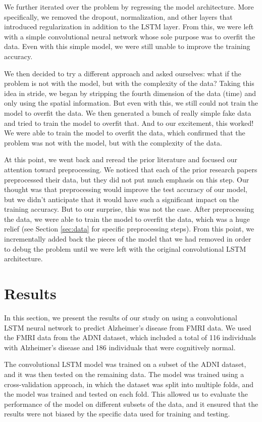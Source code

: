 \documentclass[10pt]{article}
\begin{document}
	We further iterated over the problem by regressing the model architecture. More specifically, we removed the dropout, normalization, and other layers that introduced regularization in addition to the LSTM layer. From this, we 
	were left with a simple convolutional neural network whose sole purpose was to overfit the data. Even with this simple model, we were still unable to improve the training accuracy. 

	We then decided to try a different approach and asked ourselves: what if the problem is not with the model, but with the complexity of the data? Taking this idea in stride, we began by stripping the fourth dimension of the data (time) and only using the spatial information. But even with this, we still could not train the model to overfit the data. We then generated a bunch of really simple fake data and tried to train the model to overfit that. And to our excitement, this worked! We were able to train the model to overfit the data, which confirmed that the problem was not with the model, but with the complexity of the data.

	At this point, we went back and reread the prior literature and focused our attention toward preprocessing. We noticed that each of the prior research papers preprocessed their data, but they did not put much emphasis on this step. Our thought was that preprocessing would improve the test accuracy of our model, but we didn't anticipate that it would have such a significant impact on the training accuracy. But to our surprise, this was not the case. After preprocessing the data, we were able to train the model to overfit the data, which was a huge relief (see Section \ref{sec:data} for specific preprocessing steps). From this point, we incrementally added back the pieces of the model that we had removed in order to debug the problem until we were left with the original convolutional LSTM architecture. 
	
	\section{Results}

	In this section, we present the results of our study on using a convolutional LSTM neural network to predict Alzheimer's disease from FMRI data. We used the FMRI data from the ADNI dataset, which included a total of 116 individuals with Alzheimer's disease and 186 individuals that were cognitively normal.

	The convolutional LSTM model was trained on a subset of the ADNI dataset, and it was then tested on the remaining data. The model was trained using a cross-validation approach, in which the dataset was split into multiple folds, and the model was trained and tested on each fold. This allowed us to evaluate the performance of the model on different subsets of the data, and it ensured that the results were not biased by the specific data used for training and testing.
\end{document}

